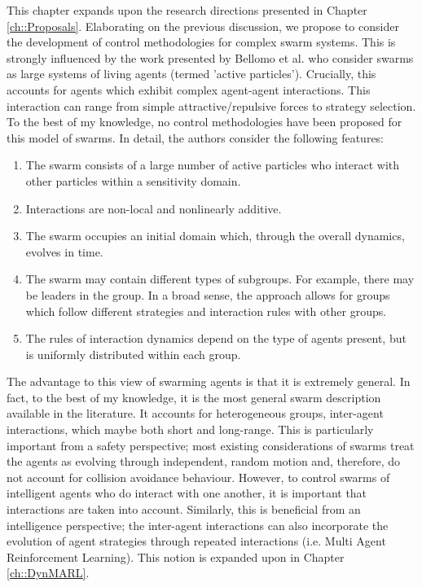 \documentclass[../sample.tex]{subfiles}
\begin{document}
	
	This chapter expands upon the research directions presented in Chapter \ref{ch::Proposals}.
	Elaborating on the previous discussion, we propose to consider the development of control
	methodologies for complex swarm systems. This is strongly influenced by the work presented by
	Bellomo et al. \cite{Bellomo2017} who consider swarms as large systems of living agents (termed
	'active particles'). Crucially, this accounts for agents which exhibit complex
	agent-agent interactions. This interaction can range from simple attractive/repulsive
	forces to strategy selection. To the best of my knowledge, no control methodologies have
	been proposed for this model of swarms. In detail, the authors consider the following features:

	\begin{enumerate}
		\item The swarm consists of a large number of active particles who interact with other
		particles within a sensitivity domain.
		\item Interactions are non-local and nonlinearly additive.
		\item The swarm occupies an initial domain which, through the overall dynamics, evolves in
		time.
		\item The swarm may contain different types of subgroups. For example, there may be leaders
		in the group. In a broad sense, the approach allows for groups which follow different
		strategies and interaction rules with other groups.
		\item The rules of interaction dynamics depend on the type of agents present, but is
		uniformly distributed within each group.
	\end{enumerate}

	The advantage to this view of swarming agents is that it is extremely general. In fact, to the best
	of my knowledge, it is the most general swarm description available in the literature. It accounts
	for heterogeneous groups, inter-agent interactions, which maybe both short and long-range. This is
	particularly important from a safety perspective; most existing considerations of swarms treat the
	agents as evolving through independent, random motion and, therefore, do not account for collision
	avoidance behaviour. However, to control swarms of intelligent agents who do interact with one
	another, it is important that interactions are taken into account. Similarly, this is beneficial
	from an intelligence perspective; the inter-agent interactions can also incorporate the evolution
	of agent strategies through repeated interactions (i.e. Multi Agent Reinforcement Learning). This
	notion is expanded upon in Chapter \ref{ch::DynMARL}.
\end{document}
